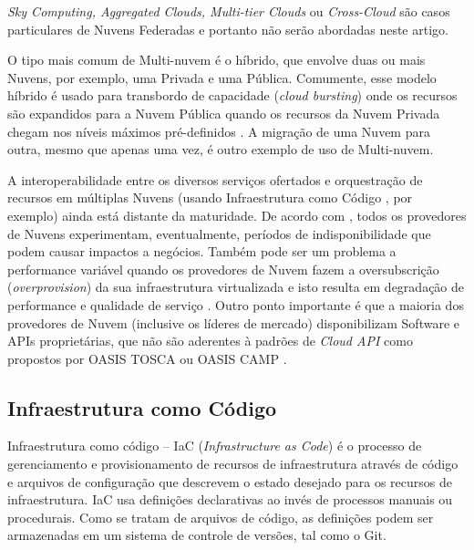 \documentclass[12pt]{article}
\begin{document}
	\textit{Sky Computing, Aggregated Clouds, Multi-tier Clouds} ou \textit{Cross-Cloud} são casos particulares de Nuvens Federadas e portanto não serão abordadas neste artigo. 
	
	O tipo mais comum de Multi-nuvem é o híbrido, que envolve duas ou mais Nuvens, por exemplo, uma Privada e uma Pública. Comumente, esse modelo híbrido é usado para transbordo de capacidade (\textit{cloud bursting}) onde os recursos são expandidos para a Nuvem Pública quando os recursos da Nuvem Privada chegam nos níveis máximos pré-definidos \cite{Ferrer:2012}. A migração de uma Nuvem para outra, mesmo que apenas uma vez, é outro exemplo de uso de Multi-nuvem.
	
	A interoperabilidade entre os diversos serviços ofertados e orquestração de recursos em múltiplas Nuvens (usando Infraestrutura como Código \cite{Morris:2016}, por exemplo) ainda está distante da maturidade. De acordo com \cite{Fisher:2018}, todos os provedores de Nuvens experimentam, eventualmente, períodos de indisponibilidade que podem causar impactos a negócios. Também pode ser um problema a performance variável quando os provedores de Nuvem fazem a oversubscrição (\textit{overprovision}) da sua infraestrutura virtualizada e isto resulta em degradação de performance e qualidade de serviço \cite{CloudSpectator:2017}. Outro ponto importante é que a maioria dos provedores de Nuvem  (inclusive os líderes de mercado) disponibilizam Software e APIs proprietárias, que não são aderentes à padrões de \textit{Cloud API} como propostos por OASIS TOSCA \cite{TOSCA:2019} ou OASIS CAMP \cite{CAMP:2019}.
	
	\subsection{Infraestrutura como Código}
	
	Infraestrutura como código – IaC (\textit{Infrastructure as Code}) é o processo de gerenciamento e provisionamento de recursos de infraestrutura através de código e arquivos de configuração que descrevem o estado desejado para os recursos de infraestrutura. IaC usa definições declarativas ao invés de processos manuais ou procedurais. Como se tratam de arquivos de código, as definições podem ser armazenadas em um sistema de controle de versões, tal como o Git.
	 
\end{document}
